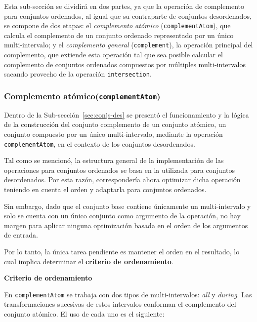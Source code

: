 Esta sub-sección se dividirá en dos partes, ya que la operación de complemento para conjuntos ordenados, al igual que su contraparte de conjuntos desordenados, se compone de dos etapas: el \textit{complemento atómico} (\texttt{complementAtom}), que calcula el complemento de un conjunto ordenado representado por un único multi-intervalo; y el \textit{complemento general} (\texttt{complement}), la operación principal del complemento, que extiende esta operación tal que sea posible calcular el complemento de conjuntos ordenados compuestos por múltiples multi-intervalos sacando provecho de la operación \texttt{intersection}.

\subsubsection{Complemento atómico(\texttt{complementAtom})}

Dentro de la Sub-sección~\ref{sec:conjs-des} se presentó el funcionamiento y la lógica de la construcción del conjunto complemento de un conjunto atómico, un conjunto compuesto por un único multi-intervalo, mediante la operación \texttt{complementAtom}, en el contexto de los conjuntos desordenados.

Tal como se mencionó, la estructura general de la implementación de las operaciones para conjuntos ordenados se basa en la utilizada para conjuntos desordenados. Por esta razón, correspondería ahora optimizar dicha operación teniendo en cuenta el orden y adaptarla para conjuntos ordenados.

Sin embargo, dado que el conjunto base contiene únicamente un multi-intervalo y solo se cuenta con un único conjunto como argumento de la operación, no hay margen para aplicar ninguna optimización basada en el orden de los argumentos de entrada. 

Por lo tanto, la única tarea pendiente es mantener el orden en el resultado, lo cual implica determinar el \textbf{criterio de ordenamiento}.

{\bf Criterio de ordenamiento}

En \texttt{complementAtom} se trabaja con dos tipos de multi-intervalos: \textit{all} y \textit{during}. Las transformaciones sucesivas de estos intervalos conforman el complemento del conjunto atómico. El uso de cada uno es el siguiente:

